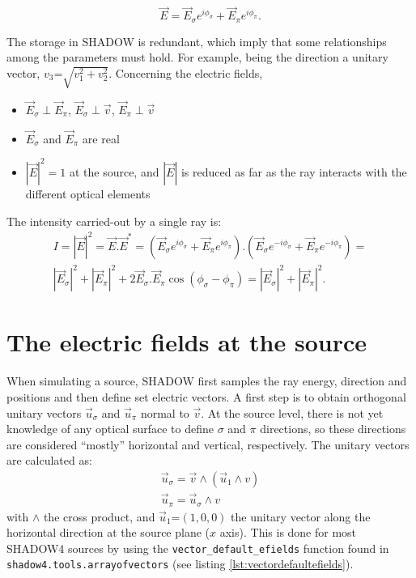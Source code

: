 \documentclass{iucr}
\begin{document}
\begin{equation}\label{eq:electricfieldray}
   \vec{E}= \vec{E}_\sigma e^{i \phi_\sigma} + \vec{E}_\pi e^{i \phi_\pi}.
\end{equation}

The storage in SHADOW is redundant, which imply that some relationships among the parameters must hold. For example, being the direction a unitary vector, $v_3\text{=}\sqrt{v_1^2+v_2^2}$. Concerning the electric fields,
\begin{itemize}
 \item $\vec{E}_\sigma \perp \vec{E}_\pi$, $\vec{E}_\sigma \perp \vec{v}$, $\vec{E}_\pi \perp \vec{v}$
 \item $\vec{E}_\sigma$ and $\vec{E}_\pi$ are real
 \item $|\vec{E}|^2=1$ at the source, and $|\vec{E}|$ is reduced as far as the ray interacts with the different 
 optical elements
\end{itemize}

The intensity carried-out by a single ray is:
\begin{eqnarray}
   I=|\vec{E}|^2 = \vec{E}.\vec{E}^* = (\vec{E}_\sigma e^{i \phi_\sigma} + \vec{E}_\pi e^{i\phi_\pi} ).
   (\vec{E}_\sigma e^{-i\phi_\sigma} + \vec{E}_\pi e^{-i\phi_\pi} ) =  \nonumber \\
   |\vec{E}_\sigma|^2 + |\vec{E}_\pi|^2 + 2 \vec{E}_\sigma.\vec{E}_\pi \cos(\phi_\sigma-\phi_\pi) =
   |\vec{E}_\sigma|^2 + |\vec{E}_\pi|^2.
\end{eqnarray}


\section{The electric fields at the source}
\label{sec:source}

When simulating a source, SHADOW first samples the ray energy, direction and positions and then define set electric vectors. 
A first step is to obtain orthogonal unitary vectors $\vec{u}_\sigma$ and $\vec{u}_\pi$ normal to $\vec{v}$. At the source 
level, there is not yet knowledge of any optical surface to define $\sigma$ and $\pi$ directions, so these directions 
are considered ``mostly'' horizontal and vertical, respectively. The unitary vectors are calculated as: 
\begin{eqnarray}
   \vec{u}_\sigma = \vec{v} \wedge (\vec{u}_1 \wedge{v}) \nonumber \\
   \vec{u}_\pi = \vec{u}_\sigma \wedge  {v}
\end{eqnarray}
with $\wedge$ the cross product, and  $\vec{u}_1\text{=}(1,0,0)$ the unitary vector along the horizontal direction at the source plane ($x$ axis).
This is done for most SHADOW4 sources by using the {\tt vector\_default\_efields} function found in {\tt shadow4.tools.arrayofvectors} (see listing \ref{lst:vectordefaultefields}).
\end{document}
